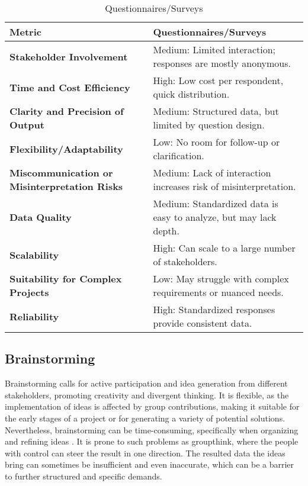 \documentclass[conference]{IEEEtran}
\begin{document}
\begin{table}[htbp]
\caption{Questionnaires/Surveys}
\label{tab2}
\centering
\begin{tabular}{|p{4cm}|p{4cm}|}
\hline
\textbf{Metric}                     & \textbf{Questionnaires/Surveys}                              \\ \hline
\textbf{Stakeholder Involvement}     & Medium: Limited interaction; responses are mostly anonymous. \\ \hline
\textbf{Time and Cost Efficiency}    & High: Low cost per respondent, quick distribution.           \\ \hline
\textbf{Clarity and Precision of Output} & Medium: Structured data, but limited by question design.    \\ \hline
\textbf{Flexibility/Adaptability}    & Low: No room for follow-up or clarification.                 \\ \hline
\textbf{Miscommunication or Misinterpretation Risks} & Medium: Lack of interaction increases risk of misinterpretation. \\ \hline
\textbf{Data Quality}                    & Medium: Standardized data is easy to analyze, but may lack depth. \\ \hline
\textbf{Scalability}                     & High: Can scale to a large number of stakeholders.           \\ \hline
\textbf{Suitability for Complex Projects} & Low: May struggle with complex requirements or nuanced needs. \\ \hline
\textbf{Reliability}                     & High: Standardized responses provide consistent data.       \\ \hline
\end{tabular}
\end{table}

\subsection*{Brainstorming}
Brainstorming calls for active participation and idea generation from different stakeholders, promoting creativity and divergent thinking. It is flexible, as the implementation of ideas is affected by group contributions, making it suitable for the early stages of a project or for generating a variety of potential solutions. Nevertheless, brainstorming can be time-consuming, specifically when organizing and refining ideas \cite{cite15}. It is prone to such problems as groupthink, where the people with control can steer the result in one direction. The resulted data the ideas bring can sometimes be insufficient and even inaccurate, which can be a barrier to further structured and specific demands.
\end{document}
